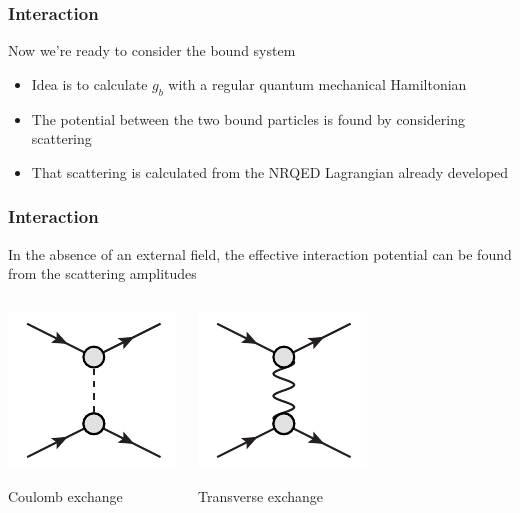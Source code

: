 \documentclass[11ppt]{beamer}
\begin{document}
\begin{frame}
\frametitle{Interaction}
Now we're ready to consider the bound system
\pause
\begin{itemize}
  \item Idea is to calculate $g_b$ with a regular quantum mechanical Hamiltonian \pause
  \item The potential between the two bound particles is found by considering scattering \pause
  \item That scattering is calculated from the NRQED Lagrangian already developed
\end{itemize}

\end{frame}



\begin{frame}
\frametitle{Interaction}
In the absence of an external field, the effective interaction potential can be found from the scattering amplitudes
\begin{columns}
\column{1in}
\begin{center} 
 \includegraphics[scale=0.6]{../eps/DashBreit}
 
 
\footnotesize Coulomb exchange \normalsize
 \end{center}

\column{1.5in}
\begin{center}  \includegraphics[scale=0.6]{../eps/WaveBreit}
 
\footnotesize Transverse exchange
 \normalsize
 \end{center}
\end{columns}

\vspace{1em}


\end{frame}
\end{document}
